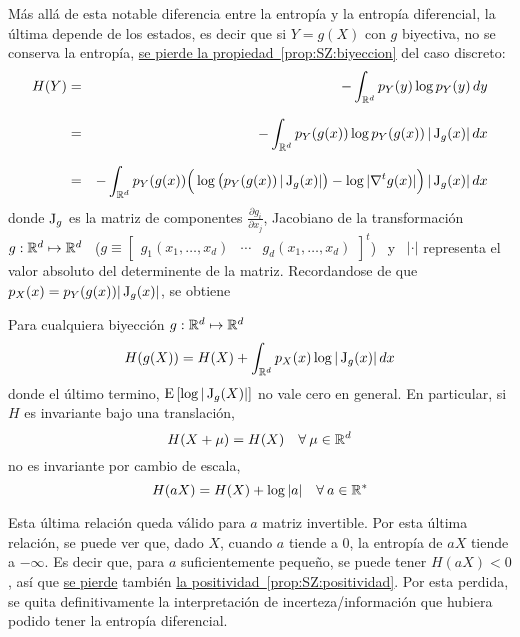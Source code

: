 M\'as  all\'a  de  esta  notable  diferencia  entre  la  entrop\'ia  y  la  entrop\'ia
diferencial, la \'ultima depende de los estados,  es decir que si $Y = g(X)$ con
$g$  biyectiva,  no  se  conserva  la  entrop\'ia,  \ie  \underline{se  pierde  la
  propiedad~\ref{prop:SZ:biyeccion}}  del  caso discreto:
%
\begin{eqnarray*}
H(Y) & = & - \int_{\Rset^d} p_Y(y) \log p_Y(y) \, dy\\[2.5mm]
%
& = &  - \int_{\Rset^d} p_Y(g(x)) \log p_Y(g(x)) \, |\Jac_g(x)| \, dx\\[2.5mm]
%
& = & - \int_{\Rset^d} p_Y(g(x)) \Big( \log \big( p_Y(g(x)) \, |\Jac_g(x)| \big) -
\log |\nabla^t g(x)| \Big) \, |\Jac_g(x)| \, dx
\end{eqnarray*}
%
donde $\operatorname{J}_g$ es la  matriz de componentes $\frac{\partial g_i}{\partial x_j}$,
Jacobiano  de  la  transformaci\'on  \   $g:  \mathbb{R}^d  \mapsto  \mathbb{R}^d$  \  ($g
\equiv  \begin{bmatrix} g_1(x_1  ,  \ldots  , x_d)  &  \cdots &  g_d(x_1  , \ldots  ,
  x_d)  \end{bmatrix}^t$) \  y  \  $|\cdot|$ representa  el  valor absoluto  del
determinente   de  la  matriz.    Recordandose  de   que  $p_X(x)   =  p_Y(g(x))
|\operatorname{J}_g(x)|$, se obtiene
%
\begin{propiedadesC}\setcounter{enumi}{\value{PropBiyeccion}}
%
\item\label{prop:SZ:biyeccionC}
Para  cualquiera biyecci\'on $g:  \mathbb{R}^d \mapsto  \mathbb{R}^d$
  \[
  H(g(X)) = H(X) + \int_{\mathbb{R}^d} p_X(x) \log |\operatorname{J}_g(x)| \, dx
  \]
  donde el \'ultimo termino, $\operatorname{E}\left[  \log |\operatorname{J}_g(X)| \right]$ no vale cero
  en general.  En particular, si $H$ es invariante bajo una translaci\'on,
  \[
  H(X+\mu) = H(X) \quad \forall \: \mu \in \mathbb{R}^d
  \]
  no  es invariante  por cambio  de escala,
  \[
  H(a X) = H(X) + \log |a| \quad \forall \: a \in \mathbb{R}^*
  \]
\end{propiedadesC}
%
Esta \'ultima  relaci\'on queda v\'alido  para $a$ matriz invertible.   Por esta
\'ultima  relaci\'on, se puede  ver que,  dado $X$,  cuando $a$  tiende a  0, la
entrop\'ia de $a X$ tiende a  $-\infty$.  Es decir que, para $a$ suficientemente
peque\~no,  se  puede  tener $H(a  X)  <  0$,  as\'i que  \underline{se  pierde}
tambi\'en   \underline{la   positividad~\ref{prop:SZ:positividad}}.   Por   esta
perdida, se quita definitivamente la interpretaci\'on de incerteza/informaci\'on
que hubiera podido tener la entrop\'ia diferencial.

